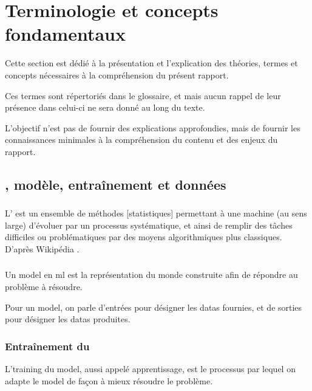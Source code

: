 \section{Terminologie et concepts fondamentaux}
Cette section est dédié à la présentation et l'explication des théories, termes et concepts nécessaires à la compréhension du présent rapport.

Ces termes sont répertoriés dans le glossaire, et mais aucun rappel de leur présence dans celui-ci ne sera donné au long du texte.

L'objectif n'est pas de fournir des explications approfondies, mais de fournir les connaissances minimales à la compréhension du contenu et des enjeux du rapport.

\subsection{, modèle, entraînement et données}
\subsubsection{} \label{subsec:ml} \label{def:ml}
L' est un ensemble de \og méthodes [statistiques] permettant à une machine (au sens large) d'évoluer par un processus systématique, et ainsi de remplir des tâches difficiles ou problématiques par des moyens algorithmiques plus classiques\fg{}. D'après Wikipédia \autocite{wiki_ml}.

\subsubsection{} \label{def:model}
Un \gls{model} en \gls{ml} est la représentation du monde construite afin de répondre au problème à résoudre.

Pour un \gls{model}, on parle d'entrées pour désigner les \glspl{data} fournies, et de sorties pour désigner les \glspl{data} produites.

\subsubsection{Entraînement du } \label{def:training}
L'\gls{training} du \gls{model}, aussi appelé apprentissage, est le processus par lequel on adapte le \gls{model} de façon à mieux résoudre le problème.

